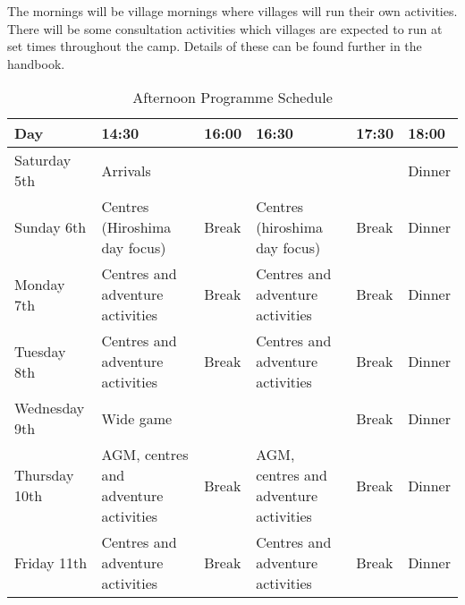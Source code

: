 \documentclass[a4paper, 11pt]{report}
\begin{document}
The mornings will be village mornings where villages will run their own activities. There will be some consultation activities which villages are expected to run at set times throughout the camp. Details of these can be found further in the handbook. 
\begin{table}[H]
    \centering
    {\RaggedRight
    \begin{tabular}{p{} p{} p{} p{} p{} p{}}
        \textbf{Day} & \textbf{14:30} & \textbf{16:00} & \textbf{16:30} & \textbf{17:30} & \textbf{18:00} \\
        \hline
        Saturday 5th & \multicolumn{4}{l}{Arrivals} & Dinner \\
        \hline
        Sunday 6th & Centres (Hiroshima day focus) & Break & Centres (hiroshima day focus) & Break & Dinner \\
        \hline
        Monday 7th & Centres and adventure activities & Break & Centres and adventure activities & Break & Dinner \\
        \hline
        Tuesday 8th & Centres and adventure activities & Break & Centres and adventure activities & Break & Dinner \\
        \hline
        Wednesday 9th & \multicolumn{3}{l}{Wide game} & Break & Dinner \\
        \hline
        Thursday 10th & AGM, centres and adventure activities & Break & AGM, centres and adventure activities & Break & Dinner \\
        \hline 
        Friday 11th & Centres and adventure activities & Break & Centres and adventure activities & Break & Dinner\\
        \hline
    \end{tabular}
    }%
    \caption{Afternoon Programme Schedule}
\end{table}
\end{document}

